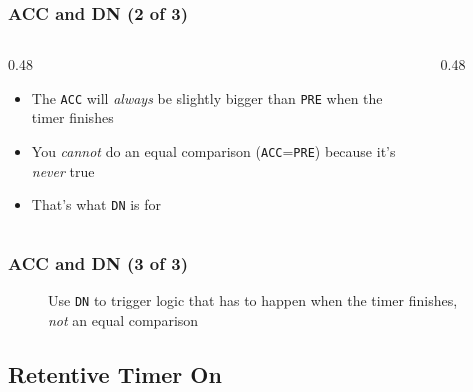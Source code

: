 \begin{frame}
    \frametitle{ACC and DN (2 of 3)}

    \begin{columns}
        \begin{column}{0.48\linewidth}
            \begin{itemize}
                \item The \texttt{ACC} will \emph{always} be slightly bigger than \texttt{PRE} when the timer finishes
                \item You \emph{cannot} do an equal comparison (\texttt{ACC}=\texttt{PRE}) because it's \emph{never} true
                \item That's what \texttt{DN} is for
            \end{itemize}    
        \end{column}        
        \begin{column}{0.48\linewidth}
            \begin{figure}
                \centering
                \resizebox{\columnwidth}{!}{
                    
                }
            \end{figure}
        \end{column}
    \end{columns}
\end{frame}

\begin{frame}
    \frametitle{ACC and DN (3 of 3)}

    \begin{figure}
        \centering
        
        
        \vspace{0.5em}
        {\small Use \texttt{DN} to trigger logic that has to happen when the timer finishes, \emph{not} an equal comparison\par}
    \end{figure}
\end{frame}

\subsection{Retentive Timer On}

